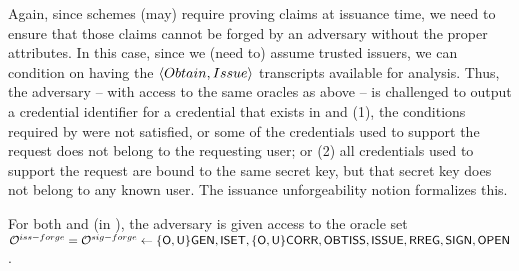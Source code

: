 Again, since \UAS schemes (may) require proving claims at issuance time, we
need to ensure that those claims cannot be forged by an adversary without the
proper attributes. In this case, since we (need to) assume trusted issuers, we
can condition on having the $\langle Obtain,Issue \rangle$ transcripts
available for analysis. Thus, the adversary -- with access to the same oracles
as above -- is challenged to output a credential identifier for a credential
that exists in \CRED and (1), the conditions required by \fissue were not
satisfied, or some of the credentials used to support the request does not
belong to the requesting user; or (2) all credentials used to support the
request are bound to the same secret key, but that secret key does not belong
to any known user. The issuance unforgeability notion formalizes this.

For both \ExpForgeIssue and \ExpForgeSign (in ), the
adversary is given access to the oracle set $\mathcal{O}^{iss-forge} = \mathcal{O}^{sig-forge} \gets
\lbrace\mathsf{O},\mathsf{U}\rbrace\mathsf{GEN},\mathsf{ISET},\lbrace\mathsf{O},\mathsf{U}\rbrace\mathsf{CORR},\mathsf{OBTISS},\mathsf{ISSUE},\mathsf{RREG},
\mathsf{SIGN},\mathsf{OPEN}$.

